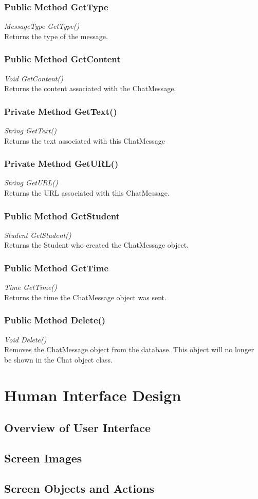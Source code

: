 \documentclass{scrreprt}
\begin{document}
\subsection{Public Method GetType}
\textit{MessageType GetType()} \\
Returns the type of the message.

\subsection{Public Method GetContent}
\textit{Void GetContent()} \\
Returns the content associated with the ChatMessage.

\subsection{Private Method GetText()}
\textit{String GetText()} \\
Returns the text associated with this ChatMessage

\subsection{Private Method GetURL()}
\textit{String GetURL()} \\
Returns the URL associated with this ChatMessage.

\subsection{Public Method GetStudent}
\textit{Student GetStudent()} \\
Returns the Student who created the ChatMessage object.

\subsection{Public Method GetTime}
\textit{Time GetTime()} \\
Returns the time the ChatMessage object was sent.

\subsection{Public Method Delete()}
\textit{Void Delete()} \\
Removes the ChatMessage object from the database. This object will no longer be shown in the Chat object class.


\chapter{Human Interface Design}

\section{Overview of User Interface}

\section{Screen Images}

\section{Screen Objects and Actions}
\end{document}
